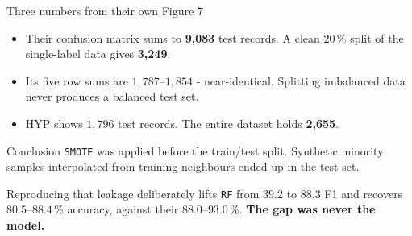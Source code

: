 \documentclass[xcolor=dvipsnames, aspectratio=169]{beamer}
\begin{document}
\begin{frame}{Three numbers from their own Figure 7}
    \begin{itemize}\setlength\itemsep{0.45em}
        \item Their confusion matrix sums to \textbf{\textcolor{sagedeep}{9{,}083}}
              test records. A clean $20\,\%$ split of the single-label data gives
              \textbf{3{,}249}.
        \item Its five row sums are $1{,}787$--$1{,}854$ - \alert{near-identical}.
              Splitting imbalanced data never produces a balanced test set.
        \item HYP shows $1{,}796$ test records. The entire dataset holds
              \textbf{2{,}655}.
    \end{itemize}

    \vspace{0.5em}
    \begin{block}{Conclusion}
        \texttt{SMOTE} was applied \alert{before} the train/test split. Synthetic
        minority samples interpolated from training neighbours ended up in the
        test set.
    \end{block}

    \vspace{0.4em}
    Reproducing that leakage deliberately lifts \texttt{RF} from $39.2$ to
    \textbf{$88.3$} F1 and recovers $80.5$--$88.4\,\%$ accuracy, against their
    $88.0$--$93.0\,\%$. \textbf{\textcolor{sagedeep}{The gap was never the model.}}
\end{frame}
\end{document}
